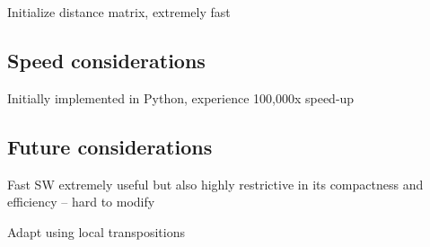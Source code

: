 \item Initialize distance matrix, extremely fast

\subsection{Speed considerations}

\item Initially implemented in Python, experience 100,000x speed-up

\subsection{Future considerations}

\item Fast SW extremely useful but also highly restrictive in its compactness and efficiency -- hard to modify

\item Adapt using local transpositions
